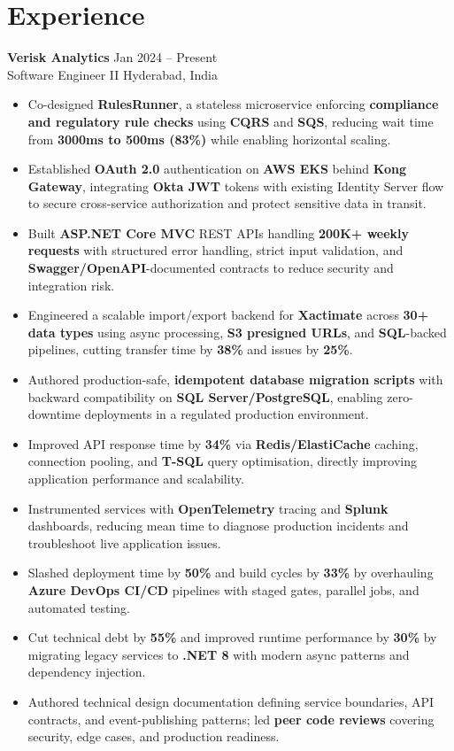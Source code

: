 \documentclass[10pt,letterpaper]{article}
\newcommand{\resumeSubheading}[4]{%
  \textbf{#1} \hfill #2 \\
  #3 \hfill #4 \\
}
\begin{document}
\section*{Experience}
\resumeSubheading{Verisk Analytics}{Jan 2024 -- Present}{Software Engineer II}{Hyderabad, India}
\begin{itemize}
    \item Co-designed \textbf{RulesRunner}, a stateless microservice enforcing \textbf{compliance and regulatory rule checks} using \textbf{CQRS} and \textbf{SQS}, reducing wait time from \textbf{3000ms to 500ms (83\%)} while enabling horizontal scaling.
    \item Established \textbf{OAuth 2.0} authentication on \textbf{AWS EKS} behind \textbf{Kong Gateway}, integrating \textbf{Okta JWT} tokens with existing Identity Server flow to secure cross-service authorization and protect sensitive data in transit.
    \item Built \textbf{ASP.NET Core MVC} REST APIs handling \textbf{200K+ weekly requests} with structured error handling, strict input validation, and \textbf{Swagger/OpenAPI}-documented contracts to reduce security and integration risk.
    \item Engineered a scalable import/export backend for \textbf{Xactimate} across \textbf{30+ data types} using async processing, \textbf{S3 presigned URLs}, and \textbf{SQL}-backed pipelines, cutting transfer time by \textbf{38\%} and issues by \textbf{25\%}.
    \item Authored production-safe, \textbf{idempotent database migration scripts} with backward compatibility on \textbf{SQL Server/PostgreSQL}, enabling zero-downtime deployments in a regulated production environment.
    \item Improved API response time by \textbf{34\%} via \textbf{Redis/ElastiCache} caching, connection pooling, and \textbf{T-SQL} query optimisation, directly improving application performance and scalability.
    \item Instrumented services with \textbf{OpenTelemetry} tracing and \textbf{Splunk} dashboards, reducing mean time to diagnose production incidents and troubleshoot live application issues.
    \item Slashed deployment time by \textbf{50\%} and build cycles by \textbf{33\%} by overhauling \textbf{Azure DevOps CI/CD} pipelines with staged gates, parallel jobs, and automated testing.
    \item Cut technical debt by \textbf{55\%} and improved runtime performance by \textbf{30\%} by migrating legacy services to \textbf{.NET 8} with modern async patterns and dependency injection.
    \item Authored technical design documentation defining service boundaries, API contracts, and event-publishing patterns; led \textbf{peer code reviews} covering security, edge cases, and production readiness.
\end{itemize}
\end{document}
